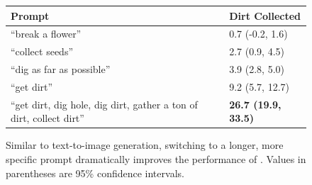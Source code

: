 \begin{figure}
    \centering
    \begin{tabular}{ll}
\toprule
Prompt & Dirt Collected \\
\midrule
``break a flower'' & 0.7 (-0.2, 1.6) \\
``collect seeds'' & 2.7 (0.9, 4.5) \\
``dig as far as possible'' & 3.9 (2.8, 5.0) \\
``get dirt'' & 9.2 (5.7, 12.7) \\
``get dirt, dig hole, dig dirt, gather a ton of dirt, collect dirt'' & \textbf{26.7 (19.9, 33.5)} \\
\bottomrule
\end{tabular}
    \vspace{0.25em}
    \caption{Similar to text-to-image generation, switching to a longer, more specific prompt dramatically improves the performance of \agentname{}. Values in parentheses are 95\% confidence intervals.}
    \label{fig:prompt_performance}
\end{figure}


